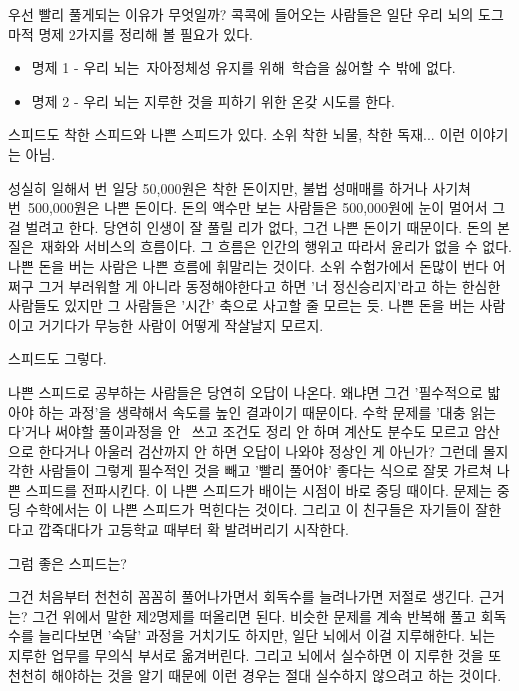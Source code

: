 우선 빨리 풀게되는 이유가 무엇일까?
콕콕에 들어오는 사람들은 일단 우리 뇌의 도그마적 명제 2가지를 정리해 볼 필요가 있다.
\vspace{5mm}
\begin{itemize}
    \item 명제 1 - 우리 뇌는 자아정체성 유지를 위해 학습을 싫어할 수 밖에 없다.
    \item 명제 2 - 우리 뇌는 지루한 것을 피하기 위한 온갖 시도를 한다.
\end{itemize}
\vspace{5mm}

스피드도 착한 스피드와 나쁜 스피드가 있다. 소위 착한 뇌물, 착한 독재... 이런 이야기는 아님.
\vspace{5mm}

성실히 일해서 번 일당 50,000원은 착한 돈이지만, 불법 성매매를 하거나 사기쳐 번 500,000원은 나쁜 돈이다.
돈의 액수만 보는 사람들은 500,000원에 눈이 멀어서 그걸 벌려고 한다. 당연히 인생이 잘 풀릴 리가 없다, 그건 나쁜 돈이기 때문이다.
돈의 본질은 재화와 서비스의 흐름이다. 그 흐름은 인간의 행위고 따라서 윤리가 없을 수 없다.
나쁜 돈을 버는 사람은 나쁜 흐름에 휘말리는 것이다.
소위 수험가에서 돈많이 번다 어쩌구 그거 부러워할 게 아니라 동정해야한다고 하면 '너 정신승리지'라고 하는 한심한 사람들도 있지만
그 사람들은 '시간' 축으로 사고할 줄 모르는 듯. 나쁜 돈을 버는 사람이고 거기다가 무능한 사람이 어떻게 작살날지 모르지.
\vspace{5mm}

스피드도 그렇다.
\vspace{5mm}

나쁜 스피드로 공부하는 사람들은 당연히 오답이 나온다.
왜냐면 그건 '필수적으로 밟아야 하는 과정'을 생략해서 속도를 높인 결과이기 때문이다.
수학 문제를 '대충 읽는다'거나 써야할 풀이과정을 안  쓰고 조건도 정리 안 하며 계산도 분수도 모르고 암산으로 한다거나
아울러 검산까지 안 하면 오답이 나와야 정상인 게 아닌가?
그런데 몰지각한 사람들이 그렇게 필수적인 것을 빼고 '빨리 풀어야' 좋다는 식으로 잘못 가르쳐 나쁜 스피드를 전파시킨다.
이 나쁜 스피드가 배이는 시점이 바로 중딩 때이다. 문제는 중딩 수학에서는 이 나쁜 스피드가 먹힌다는 것이다.
그리고 이 친구들은 자기들이 잘한다고 깝죽대다가 고등학교 때부터 확 발려버리기 시작한다.
\vspace{5mm}

그럼 좋은 스피드는?
\vspace{5mm}

그건 처음부터 천천히 꼼꼼히 풀어나가면서 회독수를 늘려나가면 저절로 생긴다.
근거는? 그건 위에서 말한 제2명제를 떠올리면 된다.
비슷한 문제를 계속 반복해 풀고 회독수를 늘리다보면 '숙달' 과정을 거치기도 하지만, 일단 뇌에서 이걸 지루해한다.
뇌는 지루한 업무를 무의식 부서로 옮겨버린다. 그리고 뇌에서 실수하면 이 지루한 것을 또 천천히 해야하는 것을 알기 때문에
이런 경우는 절대 실수하지 않으려고 하는 것이다.
\vspace{5mm}

